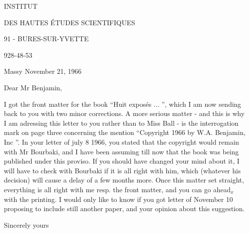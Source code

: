 INSTITUT

DES HAUTES ÉTUDES SCIENTIFIQUES

91 - BURES-SUR-YVETTE

928-48-53

Massy November 21, 1966

Dear Mr Benjamin,

I got the front matter for the book ``Huit exposés ... '', which I am now sending back to you with two minor corrections. A more serious matter - and this is why I am adressing this letter to you rather than to Miss Ball - is the interrogation mark on page three concerning the mention ``Copyright 1966 by W.A. Benjamin, Inc ''. In your letter of july 8 1966, you stated that the copyright would remain with Mr Bourbaki, and I have been assuming till now that the book was being published under this proviso. If you should have changed your mind about it, I will have to check with Bourbaki if it is all right with him, which (whatever his decision) will cause a delay of a few months more. Once this matter set straight, everything is all right with me resp. the front matter, and you can go ahead$_x$ with the printing. I would only like to know if you got  letter of November 10 proposing to include still another paper, and your opinion about this suggestion.

Sincerely yours


